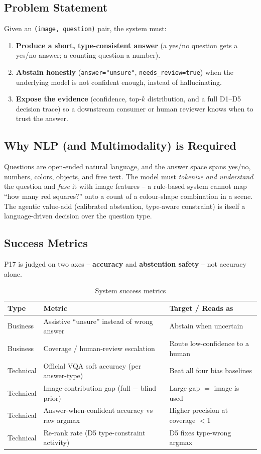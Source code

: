 \documentclass[12pt,a4paper]{article}
\begin{document}
\subsection{Problem Statement}

Given an \texttt{(image, question)} pair, the system must:
\begin{enumerate}
  \item \textbf{Produce a short, type-consistent answer} (a yes/no question gets a yes/no answer; a counting question a number).
  \item \textbf{Abstain honestly} (\texttt{answer="unsure"}, \texttt{needs\_review=true}) when the underlying model is not confident enough, instead of hallucinating.
  \item \textbf{Expose the evidence} (confidence, top-$k$ distribution, and a full D1--D5 decision trace) so a downstream consumer or human reviewer knows when to trust the answer.
\end{enumerate}

\subsection{Why NLP (and Multimodality) is Required}

Questions are open-ended natural language, and the answer space spans yes/no, numbers, colors, objects, and free text. The model must \emph{tokenize and understand} the question and \emph{fuse} it with image features -- a rule-based system cannot map ``how many red squares?'' onto a count of a colour-shape combination in a scene. The agentic value-add (calibrated abstention, type-aware constraint) is itself a language-driven decision over the question type.

\subsection{Success Metrics}

P17 is judged on two axes -- \textbf{accuracy} and \textbf{abstention safety} -- not accuracy alone.

\begin{table}[H]
\centering
\caption{System success metrics}
\begin{tabular}{lll}
\toprule
\textbf{Type} & \textbf{Metric} & \textbf{Target / Reads as} \\
\midrule
Business & Assistive ``unsure'' instead of wrong answer & Abstain when uncertain \\
Business & Coverage / human-review escalation & Route low-confidence to a human \\
Technical & Official VQA soft accuracy (per answer-type) & Beat all four bias baselines \\
Technical & Image-contribution gap (full $-$ blind prior) & Large gap $=$ image is used \\
Technical & Answer-when-confident accuracy vs raw argmax & Higher precision at coverage $<$1 \\
Technical & Re-rank rate (D5 type-constraint activity) & D5 fixes type-wrong argmax \\
\bottomrule
\end{tabular}
\end{table}
\end{document}
